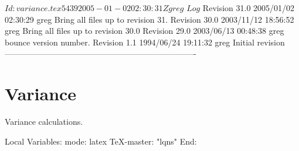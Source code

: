 \C 
\C $Id: variance.tex 5439 2005-01-02 02:30:31Z greg $
\C 
\C $Log$
\C Revision 31.0  2005/01/02 02:30:29  greg
\C Bring all files up to revision 31.
\C
\C Revision 30.0  2003/11/12 18:56:52  greg
\C Bring all files up to revision 30.0
\C
\C Revision 29.0  2003/06/13 00:48:38  greg
\C bounce version number.
\C
\C Revision 1.1  1994/06/24 19:11:32  greg
\C Initial revision
\C
\C
\C ----------------------------------------------------------------------
\section{Variance}

Variance calculations.

\C Local Variables: 
\C mode: latex
\C TeX-master: "lqns"
\C End: 
